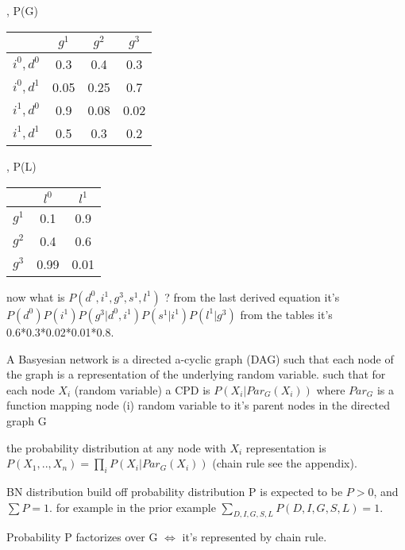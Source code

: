 \documentclass[4apaper,12pt]{book}
\begin{document}
\begin{description}
\begin{description}
\begin{description}
\begin{tabular} { |c|c|c| }
        \hline
      \end{tabular},  P(G) \begin{tabular} { |c|c|c|c| }
        \hline
        & $g^1$ & $g^2$ & $g^3$  \\
        \hline
        \hline
        $i^0,d^0$ & 0.3 & 0.4 & 0.3 \\
        \hline
        $i^0,d^1$ & 0.05 & 0.25 & 0.7 \\
        \hline
        $i^1,d^0$ & 0.9 & 0.08 & 0.02 \\
        \hline
        $i^1,d^1$ & 0.5 & 0.3 & 0.2 \\
        \hline
      \end{tabular},  P(L) \begin{tabular} {|c|c|c|}
        \hline
        & $l^0$ & $l^1$ \\
        \hline
        \hline
        $g^1$ & 0.1 & 0.9 \\
        \hline
        $g^2$ & 0.4 & 0.6 \\
        \hline
        $g^3$ & 0.99 & 0.01 \\
        \hline
      \end{tabular}
        \item now what is $P(d^0,i^1,g^3,s^1,l^1)$ ? from the last derived equation it's $P(d^0)P(i^1)P(g^3|d^0,i^1)P(s^1|i^1)P(l^1|g^3)$ from the tables it's 0.6*0.3*0.02*0.01*0.8.
      \end{description}
    \item A Basyesian network is a directed a-cyclic graph (DAG) such that each node of the graph is a representation of the underlying random variable. such that for each node $X_i$ (random variable) a CPD is $P(X_i|Par_G(X_i))$ where $Par_G$ is a function mapping node (i) random variable to it's parent nodes in the directed graph G
    \item the probability distribution at any node with $X_i$ representation is $P(X_1,..,X_n)=\prod_i{P(X_i|Par_G(X_i))}$ (chain rule see the appendix).
    \item BN distribution build off probability distribution P is expected to be $ P > 0 $, and $\sum {P} = 1$. for example in the prior example $\sum_{D,I,G,S,L}P(D,I,G,S,L)=1$.
    \item Probability P factorizes over G $\iff$ it's represented by chain rule.

\end{description}
\end{description}
\end{document}
